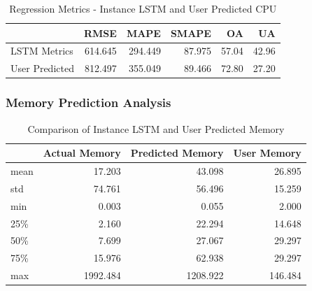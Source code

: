       \begin{table}
        \centering
        \caption{Regression Metrics - Instance LSTM and User Predicted CPU}
        \label{tab:regression-metrics-instance-lstm-user-predicted-cpu}

        \begin{tabular}{|l|rrrrr|}
          \toprule
          {} &     RMSE &     MAPE &   SMAPE &     OA &     UA \\
          \midrule
          LSTM Metrics   &  614.645 &  294.449 &  87.975 &  57.04 &  42.96 \\
          User Predicted &  812.497 &  355.049 &  89.466 &  72.80 &  27.20 \\
          \bottomrule
        \end{tabular}
      \end{table}

    \subsubsection{Memory Prediction Analysis}
    \label{sec:mem-prediction-analysis-instance-knowledge-lstm-evaluation}

      \begin{table}
        \centering
        \caption{Comparison of Instance LSTM and User Predicted Memory}
        \label{tab:comparison-instance-lstm-user-predicted-memory}

        \begin{tabular}{|l|rrr|}
          \toprule
          {} &  Actual Memory &  Predicted Memory &  User Memory \\
          \midrule
          mean &            17.203 &               43.098 &         26.895 \\
          std  &            74.761 &               56.496 &         15.259 \\
          min  &             0.003 &                0.055 &          2.000 \\
          25\%  &             2.160 &               22.294 &         14.648 \\
          50\%  &             7.699 &               27.067 &         29.297 \\
          75\%  &            15.976 &               62.938 &         29.297 \\
          max  &          1992.484 &             1208.922 &        146.484 \\
          \bottomrule
        \end{tabular}
      \end{table}
      
